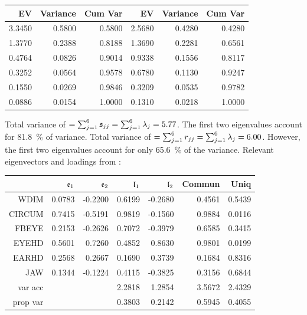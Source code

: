 \begin{tabular}{rrr|rrr}
  \toprule
  EV     & Variance & Cum Var & EV & Variance & Cum Var\\
  \midrule
  3.3450 & 0.5800 & 0.5800 & 2.5680 & 0.4280 & 0.4280 \\
  1.3770 & 0.2388 & 0.8188 & 1.3690 & 0.2281 & 0.6561 \\
  0.4764 & 0.0826 & 0.9014 & 0.9338 & 0.1556 & 0.8117 \\
  0.3252 & 0.0564 & 0.9578 & 0.6780 & 0.1130 & 0.9247 \\
  0.1550 & 0.0269 & 0.9846 & 0.3209 & 0.0535 & 0.9782 \\
  0.0886 & 0.0154 & 1.0000 & 0.1310 & 0.0218 & 1.0000 \\
  \bottomrule
\end{tabular}
\vspace{5mm}

Total variance of  \(= \sum_{j=1}^6{\mathfrak{s}_{jj}} = \sum_{j=1}^6{\lambda_j} = 5.77 \). The first two eigenvalues account for \SI{81.8}{\%} of variance. Total variance of  \(= \sum_{j=1}^6{r_{jj}} = \sum_{j=1}^6{\lambda_j} = 6.00 \). However, the first two eigenvalues account for only \SI{65.6}{\%} of the variance. Relevant eigenvectors and loadings from :

\begin{tabular}{rrrrrrr}
  \toprule
         & \(\mathfrak{e}_1 \) & \(\mathfrak{e}_2 \) & \(\mathfrak{l}_1 \) & \(\mathfrak{l}_2 \) & Commun & Uniq \\
  \midrule
  WDIM   & 0.0783 & -0.2200 & 0.6199 & -0.2680 & 0.4561 & 0.5439 \\
  CIRCUM & 0.7415 & -0.5191 & 0.9819 & -0.1560 & 0.9884 & 0.0116 \\
  FBEYE  & 0.2153 & -0.2626 & 0.7072 & -0.3979 & 0.6585 & 0.3415 \\
  EYEHD  & 0.5601 &  0.7260 & 0.4852 &  0.8630 & 0.9801 & 0.0199 \\
  EARHD  & 0.2568 &  0.2667 & 0.1690 &  0.3739 & 0.1684 & 0.8316 \\
  JAW    & 0.1344 & -0.1224 & 0.4115 & -0.3825 & 0.3156 & 0.6844 \\
  \midrule
  var acc&        &         & 2.2818 &  1.2854 & 3.5672	& 2.4329 \\
  prop var&       &         & 0.3803 &  0.2142 & 0.5945	& 0.4055 \\
  \bottomrule
\end{tabular}
\vspace{5mm}


